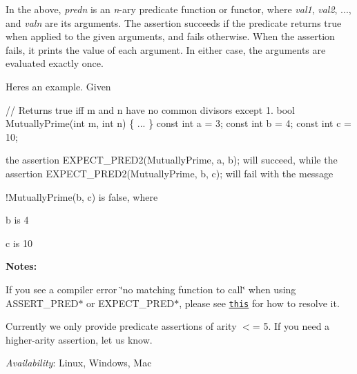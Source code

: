 In the above, {\itshape predn} is an {\itshape n}-\/ary predicate function or functor, where {\itshape val1}, {\itshape val2}, ..., and {\itshape valn} are its arguments. The assertion succeeds if the predicate returns {\ttfamily true} when applied to the given arguments, and fails otherwise. When the assertion fails, it prints the value of each argument. In either case, the arguments are evaluated exactly once.

Here\textquotesingle{}s an example. Given


\begin{DoxyCode}
// Returns true iff m and n have no common divisors except 1.
bool MutuallyPrime(int m, int n) \{ ... \}
const int a = 3;
const int b = 4;
const int c = 10;
\end{DoxyCode}


the assertion {\ttfamily E\+X\+P\+E\+C\+T\+\_\+\+P\+R\+E\+D2(\+Mutually\+Prime, a, b);} will succeed, while the assertion {\ttfamily E\+X\+P\+E\+C\+T\+\_\+\+P\+R\+E\+D2(\+Mutually\+Prime, b, c);} will fail with the message


\begin{DoxyPre}
!MutuallyPrime(b, c) is false, where~\newline

b is 4~\newline

c is 10~\newline

\end{DoxyPre}


{\bfseries Notes\+:}


\begin{DoxyEnumerate}
\item If you see a compiler error \char`\"{}no matching function to call\char`\"{} when using {\ttfamily A\+S\+S\+E\+R\+T\+\_\+\+P\+R\+E\+D$\ast$} or {\ttfamily E\+X\+P\+E\+C\+T\+\_\+\+P\+R\+E\+D$\ast$}, please see \href{v1_6_FAQ.md#ithe-compiler-complains-about-undefined-references-to-some-static-const-member-variables-but-i-did-define-them-in-the-class-body-whats-wrong}{\tt this} for how to resolve it.
\end{DoxyEnumerate}
\begin{DoxyEnumerate}
\item Currently we only provide predicate assertions of arity $<$= 5. If you need a higher-\/arity assertion, let us know.
\end{DoxyEnumerate}

{\itshape Availability}\+: Linux, Windows, Mac

